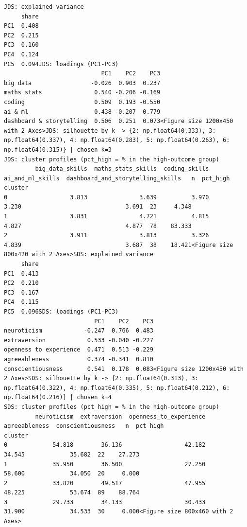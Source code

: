 \documentclass[conference]{IEEEtran}
\begin{document}
\begin{lstlisting}[style=outputstyle,caption={Execution Output G.10: PCA Loadings and Cluster Profiles.},label={out:clustering}]
JDS: explained variance
     share
PC1  0.408
PC2  0.215
PC3  0.160
PC4  0.124
PC5  0.094JDS: loadings (PC1-PC3)
                            PC1    PC2    PC3
big data                 -0.026  0.903  0.237
maths stats               0.540 -0.206 -0.169
coding                    0.509  0.193 -0.550
ai & ml                   0.438 -0.207  0.779
dashboard & storytelling  0.506  0.251  0.073<Figure size 1200x450 with 2 Axes>JDS: silhouette by k -> {2: np.float64(0.333), 3: np.float64(0.337), 4: np.float64(0.283), 5: np.float64(0.263), 6: np.float64(0.315)} | chosen k=3
JDS: cluster profiles (pct_high = % in the high-outcome group)
         big_data_skills  maths_stats_skills  coding_skills  ai_and_ml_skills  dashboard_and_storytelling_skills   n  pct_high
cluster                                                                                                                       
0                  3.813               3.639          3.970             3.230                              3.691  23     4.348
1                  3.831               4.721          4.815             4.827                              4.877  78    83.333
2                  3.911               3.813          3.326             4.839                              3.687  38    18.421<Figure size 800x420 with 2 Axes>SDS: explained variance
     share
PC1  0.413
PC2  0.210
PC3  0.167
PC4  0.115
PC5  0.096SDS: loadings (PC1-PC3)
                          PC1    PC2    PC3
neuroticism            -0.247  0.766  0.483
extraversion            0.533 -0.040 -0.227
openness to experience  0.471  0.513 -0.229
agreeableness           0.374 -0.341  0.810
conscientiousness       0.541  0.178  0.083<Figure size 1200x450 with 2 Axes>SDS: silhouette by k -> {2: np.float64(0.313), 3: np.float64(0.322), 4: np.float64(0.335), 5: np.float64(0.212), 6: np.float64(0.216)} | chosen k=4
SDS: cluster profiles (pct_high = % in the high-outcome group)
         neuroticism  extraversion  openness_to_experience  agreeableness  conscientiousness   n  pct_high
cluster                                                                                                   
0             54.818        36.136                  42.182         34.545             35.682  22    27.273
1             35.950        36.500                  27.250         58.600             34.050  20     0.000
2             33.820        49.517                  47.955         48.225             53.674  89    88.764
3             29.733        34.133                  30.433         31.900             34.533  30     0.000<Figure size 800x460 with 2 Axes>
\end{lstlisting}
\end{document}

